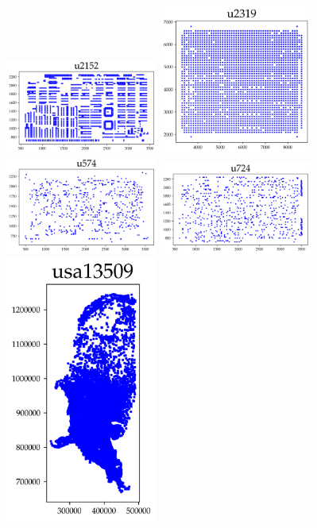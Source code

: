 \begin{appendices}
\begin{figure}[H]
\centering
\includegraphics[width=5cm]{../tsplib_euc2d_pictures_of_instances/u2152.png}
\includegraphics[width=5cm]{../tsplib_euc2d_pictures_of_instances/u2319.png}
\includegraphics[width=5cm]{../tsplib_euc2d_pictures_of_instances/u574.png}
\includegraphics[width=5cm]{../tsplib_euc2d_pictures_of_instances/u724.png}
\includegraphics[width=5cm]{../tsplib_euc2d_pictures_of_instances/usa13509.png}

\end{figure}
\end{appendices}
